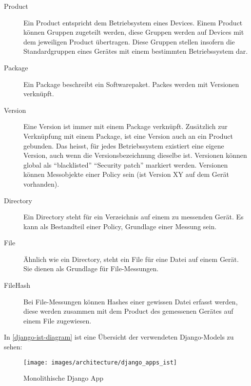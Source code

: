 \begin{description}
	\item[Product] Ein Product entspricht dem Betriebsystem eines Devices. Einem
	Product können Gruppen zugeteilt werden, diese Gruppen werden auf Devices mit
	dem jeweiligen Product übertragen. Diese Gruppen stellen insofern die
	Standardgruppen eines Gerätes mit einem bestimmten Betriebssystem dar.
	
	\item[Package] Ein Package beschreibt ein Softwarepaket. Packes werden mit Versionen verknüpft.
	
	\item[Version] Eine Version ist immer mit einem Package verknüpft. 
	Zusätzlich zur Verknüpfung mit einem Package, ist eine Version auch an ein Product gebunden.
	Das heisst, für jedes Betriebssystem existiert eine eigene Version, auch wenn die Versionsbezeichnung dieselbe ist.
	Versionen können global als \enquote{blacklisted} \enquote{Security patch} markiert werden.
	Versionen können Messobjekte einer Policy sein (ist Version XY auf dem Gerät vorhanden).
		
	\item[Directory] Ein Directory steht für ein Verzeichnis auf einem zu messenden
	Gerät. Es kann als Bestandteil einer Policy, Grundlage einer Messung sein.
	
	\item[File] Ähnlich wie ein Directory, steht ein File für eine Datei auf einem
	Gerät. Sie dienen als Grundlage für File-Messungen.
	
	\item[FileHash] Bei File-Messungen können Hashes einer gewissen Datei erfasst
	werden, diese werden zusammen mit dem Product des gemessenen Gerätes auf einem
	File zugewiesen.
	
\end{description}

In \autoref{django-ist-diagram} ist eine Übersicht der verwendeten Django-Models
zu sehen:
\begin{figure}[H]
	\centering
	\texttt{[image: images/architecture/django\_apps\_ist]}
    \caption{Monolithische Django App}
    \label{django-ist-diagram}
\end{figure}

